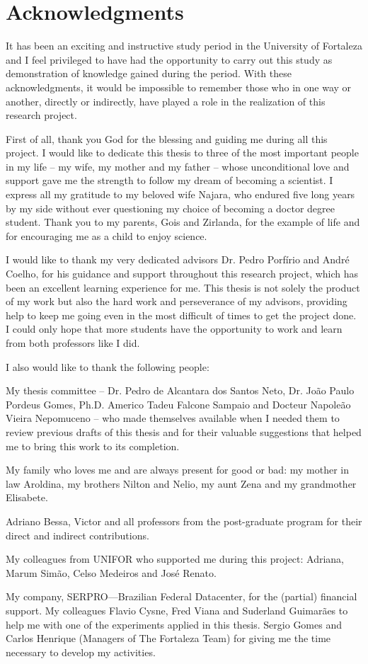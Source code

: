 \chapter*{Acknowledgments} 



It has been an exciting and instructive study period in the University of Fortaleza and I
feel privileged to have had the opportunity to carry out this study as demonstration of
knowledge gained during the period. With these acknowledgments, it would be impossible to remember those who in one way or another, directly or indirectly, have played a role in the realization of this research project. 

First of all, thank you God for the blessing and guiding me during all this project. I would like to dedicate this thesis to three of the most important people in my life
– my wife, my mother and my father – whose unconditional love and support gave me the
strength to follow my dream of becoming a scientist. I express all my gratitude to my beloved wife Najara, who endured five long years by my side without ever questioning my choice of becoming a doctor degree student. Thank you to my parents, Gois and Zirlanda,  for the example of life and for encouraging me as a child to enjoy science.

I would like to thank my very dedicated advisors Dr. Pedro Porfírio and André Coelho, for his guidance and support throughout this research project, which has been an excellent
learning experience for me. This thesis is not solely the product of my work but also the hard work and perseverance of my advisors, providing  help to keep me going even in the most difficult of times to get the project done. I could only hope that more students have the opportunity to work and learn from both professors like I did.

I also would like to thank the following people:

My thesis committee – Dr. Pedro de Alcantara dos Santos Neto, Dr. João Paulo Pordeus Gomes, Ph.D. Americo Tadeu Falcone Sampaio and Docteur Napoleão Vieira Nepomuceno – who made themselves available when I needed them to review previous drafts of this thesis and for their valuable suggestions that helped me to bring this work to its completion.

My family who loves me and are always present for good or bad: my mother in law Aroldina, my brothers Nilton and Nelio, my aunt Zena and my grandmother Elisabete.

Adriano Bessa, Victor and all professors from the post-graduate program for their direct and indirect contributions.

My colleagues from UNIFOR who supported me during this project: Adriana, Marum Simão, Celso Medeiros and José Renato. 

My company, SERPRO—Brazilian Federal Datacenter, for the (partial) financial support. My colleagues  Flavio Cysne, Fred Viana and Suderland Guimarães to help me with one of the experiments applied in this thesis. Sergio Gomes and Carlos Henrique (Managers of The Fortaleza Team) for giving me the time necessary to develop my activities.


